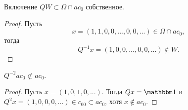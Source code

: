 \begin{proposition}
	Включение $QW\subset \Omega\cap ac_0$ собственное.
\end{proposition}

\begin{proof}
	Пусть
	\begin{equation}
		x = (1,1,0,0,...,0,0,...) \in \Omega\cap ac_0,
	\end{equation}
	тогда
	\begin{equation}
		Q^{-1}x = (1,0,0,...,0,0,...) \notin W
		.
	\end{equation}
\end{proof}

\begin{proposition}
	$Q^{-2} ac_0 \not \subset ac_0$.
\end{proposition}

\begin{proof}
	Пусть $x=(1,0,1,0,...)$.
	Тогда $Qx = \one$ и $Q^2 x = (1,0,0,0,...) \in c_{00} \subset ac_0$,
	хотя $x\notin ac_0$.
\end{proof}
